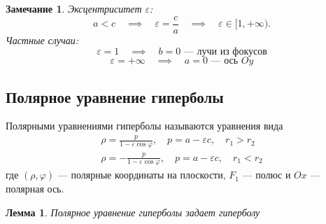 \documentclass[a4paper,12pt,oneside]{extbook}
\theoremstyle{numbered}
\theoremstyle{unnumbered}
\theoremstyle{named}
\theoremstyle{unnumbered}
\theoremstyle{named}
\newtheorem{lemma}{Лемма}[section]
\theoremstyle{named}
\theoremstyle{named}
\newtheorem*{note}{Замечание}
\begin{document}
\begin{note}
    Эксцентриситет \(\varepsilon\):
    \[
        a < c \quad \implies \quad \varepsilon = \frac{c}{a} \quad \implies \quad \varepsilon \in [1, +\infty).
    \]
    Частные случаи:
    \[
        \varepsilon = 1 \quad \implies \quad b = 0 \text{ — лучи из фокусов}
    \]
    \[
        \varepsilon = +\infty \quad \implies \quad a = 0 \text{ — ось } Oy
    \]
\end{note}

\subsection{Полярное уравнение гиперболы}%
\label{sub:Полярное уравнение гиперболы}

\begin{siderules}
    Полярными уравнениями гиперболы называются уравнения вида
    \begin{gather*}
        \rho = \frac{p}{1 - \varepsilon \cos{\varphi}}, \quad p = a - \varepsilon c, \quad r_1 > r_2 \\
        \rho = -\frac{p}{1 - \varepsilon \cos{\varphi}}, \quad p = a - \varepsilon c, \quad r_1 < r_2
    \end{gather*}
    где \((\rho, \varphi)\) — полярные координаты на плоскости, \(F_1\) — полюс и \(Ox\) — полярная ось.
\end{siderules}

\begin{lemma}
    Полярное уравнение гиперболы задает гиперболу
\end{lemma}
\end{document}
